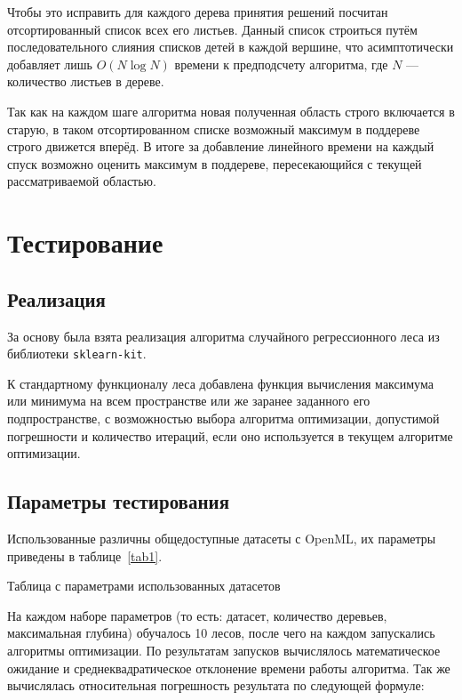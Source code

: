 \documentclass[pscyr,specification,annotation]{itmo-student-thesis}
\begin{document}
Чтобы это исправить для каждого дерева принятия решений посчитан отсортированный
список всех его листьев. Данный список строиться путём последовательного слияния
списков детей в каждой вершине, что асимптотически добавляет лишь $O(N \log{N})$
времени к предподсчету алгоритма, где $N$ --- количество листьев в дереве.

Так как на каждом шаге алгоритма новая полученная область строго включается
в старую, в таком отсортированном списке возможный максимум в поддереве строго
движется вперёд. В итоге за добавление линейного времени на каждый спуск
возможно оценить максимум в поддереве, пересекающийся с текущей рассматриваемой
областью.

\chapter{Тестирование}
\section{Реализация}
За основу была взята реализация алгоритма случайного регрессионного леса из
библиотеки \texttt{sklearn-kit}. 

К стандартному функционалу леса добавлена
функция вычисления максимума или минимума на всем пространстве или же заранее
заданного его подпространстве, с возможностью выбора алгоритма оптимизации, 
допустимой погрешности и количество итераций, если оно используется в текущем 
алгоритме оптимизации.
\section{Параметры тестирования}

Использованные различны общедоступные датасеты с OpenML, их параметры приведены
в таблице~\ref{tab1}.

\begin{center}
    \begin{table}[!h]
    \caption{Таблица с параметрами использованных датасетов}\label{tab1}
        
    \end{table}
\end{center}

На каждом наборе параметров (то есть: датасет, количество деревьев, максимальная
глубина) обучалось 10 лесов, после чего на каждом запускались алгоритмы
оптимизации. По результатам запусков вычислялось математическое ожидание
и среднеквадратическое отклонение времени работы алгоритма.
Так же вычислялась относительная погрешность результата по следующей формуле:
\end{document}
